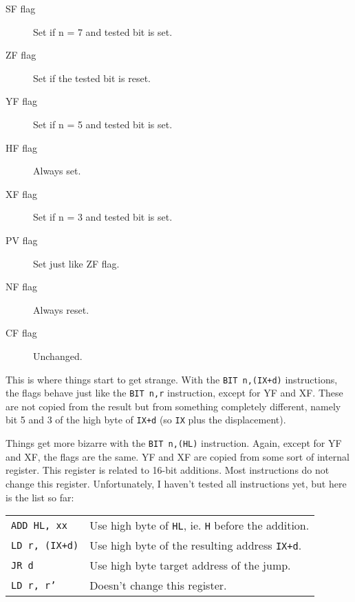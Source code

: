 \begin{description}
	\item[SF flag]
	Set if n = 7 and tested bit is set.

	\item[ZF flag]
	Set if the tested bit is reset.

	\item[YF flag]
	Set if n = 5 and tested bit is set.

	\item[HF flag]
	Always set.

	\item[XF flag]
	Set if n = 3 and tested bit is set.

	\item[PV flag]
	Set just like ZF flag.

	\item[NF flag]
	Always reset. 

	\item[CF flag]
	Unchanged.

\end{description}

This is where things start to get strange. With the {\tt BIT n,(IX+d)} instructions, the flags behave just like the {\tt BIT n,r} instruction, except for YF and XF. These are not copied from the result but from something completely different, namely bit 5 and 3 of the high byte of {\tt IX+d} (so {\tt IX} plus the displacement).

Things get more bizarre with the {\tt BIT n,(HL)} instruction. Again, except for YF and XF, the flags are the same. YF and XF are copied from some sort of internal register. This register is related to 16-bit additions. Most instructions do not change this register. Unfortunately, I haven't tested all instructions yet, but here is the list so far:

\begin{tabularx}{\linewidth}{@{}lX}
	{\tt ADD HL, xx}
		& Use high byte of {\tt HL}, ie. {\tt H} before the addition. \\

	{\tt LD r, (IX+d)}
		& Use high byte of the resulting address {\tt IX+d}. \\

	{\tt JR d}
		& Use high byte target address of the jump. \\

	{\tt LD r, r'}
		& Doesn't change this register. \\
\end{tabularx}

